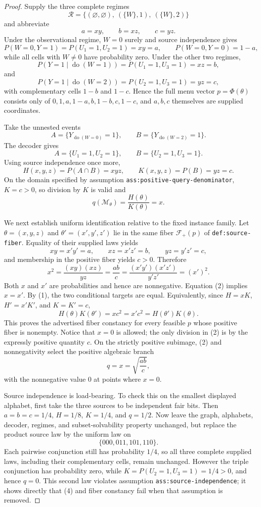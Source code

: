 \documentclass{article}
\begin{document}
\begin{proof}
Supply the three complete regimes
\[
 \mathcal R=\bigl\{(\varnothing,\varnothing),\ (\{W\},1),\ (\{W\},2)\bigr\}
\]
and abbreviate
\[
 a=xy,\qquad b=xz,\qquad c=yz.
\]
Under the observational regime, \(W=0\) surely and source independence gives
\[
 P(W=0,Y=1)=P(U_1=1,U_2=1)=xy=a,
 \qquad P(W=0,Y=0)=1-a,
\]
while all cells with \(W\neq0\) have probability zero.  Under the other two regimes,
\[
 P(Y=1\mid\operatorname{do}(W=1))=P(U_1=1,U_3=1)=xz=b,
\]
and
\[
 P(Y=1\mid\operatorname{do}(W=2))=P(U_2=1,U_3=1)=yz=c,
\]
with complementary cells \(1-b\) and \(1-c\).  Hence the full menu vector \(p=\Phi(\theta)\) consists only of \(0,1,a,1-a,b,1-b,c,1-c\), and \(a,b,c\) themselves are supplied coordinates.

Take the unnested events
\[
 A=\{Y_{\operatorname{do}(W=0)}=1\},
 \qquad
 B=\{Y_{\operatorname{do}(W=2)}=1\}.
\]
The decoder gives
\[
 A=\{U_1=1,U_2=1\},
 \qquad
 B=\{U_2=1,U_3=1\}.
\]
Using source independence once more,
\[
 H(x,y,z)=P(A\cap B)=xyz,
 \qquad
 K(x,y,z)=P(B)=yz=c.
\]
On the domain specified by assumption \texttt{ass:positive-query-denominator}, \(K=c>0\), so division by \(K\) is valid and
\[
 q(\mathcal M_\theta)=\frac{H(\theta)}{K(\theta)}=x. \tag{1}
\]

We next establish uniform identification relative to the fixed instance family.  Let \(\theta=(x,y,z)\) and \(\theta'=(x',y',z')\) lie in the same fiber \(\mathcal F_+(p)\) of \texttt{def:source-fiber}.  Equality of their supplied laws yields
\[
 xy=x'y'=a,\qquad xz=x'z'=b,\qquad yz=y'z'=c,
\]
and membership in the positive fiber yields \(c>0\).  Therefore
\[
 x^2=\frac{(xy)(xz)}{yz}=\frac{ab}{c}
     =\frac{(x'y')(x'z')}{y'z'}=(x')^2. \tag{2}
\]
Both \(x\) and \(x'\) are probabilities and hence are nonnegative.  Equation (2) implies \(x=x'\).  By (1), the two conditional targets are equal.  Equivalently, since \(H=xK\), \(H'=x'K'\), and \(K=K'=c\),
\[
 H(\theta)K(\theta')=xc^2=x'c^2=H(\theta')K(\theta). \tag{3}
\]
This proves the advertised fiber constancy for every feasible \(p\) whose positive fiber is nonempty.  Notice that \(x=0\) is allowed; the only division in (2) is by the expressly positive quantity \(c\).  On the strictly positive subimage, (2) and nonnegativity select the positive algebraic branch
\[
 q=x=\sqrt{\frac{ab}{c}}, \tag{4}
\]
with the nonnegative value \(0\) at points where \(x=0\).

Source independence is load-bearing.  To check this on the smallest displayed alphabet, first take the three sources to be independent fair bits.  Then \(a=b=c=1/4\), \(H=1/8\), \(K=1/4\), and \(q=1/2\).  Now leave the graph, alphabets, decoder, regimes, and subset-solvability property unchanged, but replace the product source law by the uniform law on
\[
 \{000,011,101,110\}.
\]
Each pairwise conjunction still has probability \(1/4\), so all three complete supplied laws, including their complementary cells, remain unchanged.  However the triple conjunction has probability zero, while \(K=P(U_2=1,U_3=1)=1/4>0\), and hence \(q=0\).  This second law violates assumption \texttt{ass:source-independence}; it shows directly that (4) and fiber constancy fail when that assumption is removed.


\end{proof}
\end{document}
